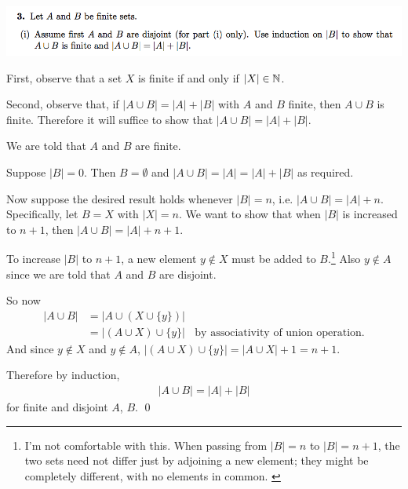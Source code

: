 \documentclass[12pt]{article}
\begin{document}
\subsection*{} %
\includegraphics[width=400pt]{img/iulm-1-3.png}
\begin{mdframed}
First, observe that a set $X$ is finite if and only if $|X| \in \mathbb{N}$.

Second, observe that, if $|A \cup B| = |A| + |B|$ with $A$ and $B$ finite, then
$A \cup B$ is finite. Therefore it will suffice to show that
$|A \cup B| = |A| + |B|$.

We are told that $A$ and $B$ are finite.

Suppose $|B| = 0$. Then $B = \emptyset$ and $|A \cup B| = |A| = |A| + |B|$ as required.

Now suppose the desired result holds whenever $|B| = n$, i.e.
$|A \cup B| = |A| + n$. Specifically, let $B = X$ with $|X| = n$. We want to
show that when $|B|$ is increased to $n+1$, then $|A \cup B| = |A| + n+1$.

To increase $|B|$ to $n+1$, a new element $y \notin X$ must be added to
$B$.\footnote{I'm not comfortable with this. When passing from $|B| = n$ to
  $|B| = n+1$, the two sets need not differ just by adjoining a new element;
  they might be completely different, with no elements in
  common. \label{cardinality-induction-discomfort}} Also $y \notin A$ since we
are told that $A$ and $B$ are disjoint.




 So now
\begin{align*}
  |A \cup B| &= |A \cup (X \cup \{y\})|\\
             &= |(A \cup X) \cup \{y\}| ~~~~\text{by associativity of union operation.}
\end{align*}
And since $y \notin X$ and $y \notin A$, $|(A \cup X) \cup \{y\}| = |A \cup X| + 1 = n + 1$.

Therefore by induction,
\begin{align*}
  |A \cup B| = |A| + |B|
\end{align*}
for finite and disjoint $A$, $B$. \qed
\end{mdframed}
\end{document}
